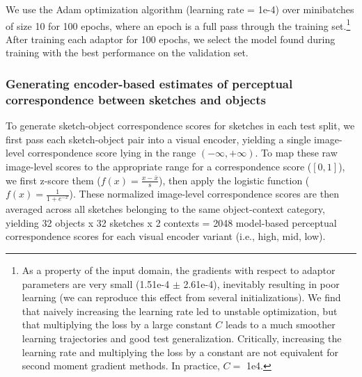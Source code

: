 \documentclass{svjour3}
\begin{document}

We use the Adam optimization algorithm \citep*{kingma2014adam} (learning rate = 1e-4) over minibatches of size 10 for 100 epochs, where an epoch is a full pass through the training set.\footnote{As a property of the input domain, the gradients with respect to adaptor parameters are very small (1.51e-4 $\pm$ 2.61e-4), inevitably resulting in poor learning (we can reproduce this effect from several initializations). We find that naively increasing the learning rate led to unstable optimization, but that multiplying the loss by a large constant $C$ leads to a much smoother learning trajectories and good test generalization. Critically, increasing the learning rate and multiplying the loss by a constant are not equivalent for second moment gradient methods. In practice, $C =$ 1e4.}  
After training each adaptor for 100 epochs, we select the model found during training with the best performance on the validation set. 

\subsubsection*{Generating encoder-based estimates of perceptual correspondence between sketches and objects}

To generate sketch-object correspondence scores for sketches in each test split, we first pass each sketch-object pair into a visual encoder, yielding a single image-level correspondence score lying in the range $(-\infty,+\infty)$. 
To map these raw image-level scores to the appropriate range for a correspondence score ($[0,1]$), we first z-score them ($f(x) = \frac{x - \bar{x}}{\mathrm{s}}$), then apply the logistic function ($f(x)= \frac{1}{1+e^{-x}}$).
These normalized image-level correspondence scores are then averaged across all sketches belonging to the same object-context category, yielding 32 objects x 32 sketches x 2 contexts  = 2048 model-based perceptual correspondence scores for each visual encoder variant (i.e., high, mid, low).

\end{document}
